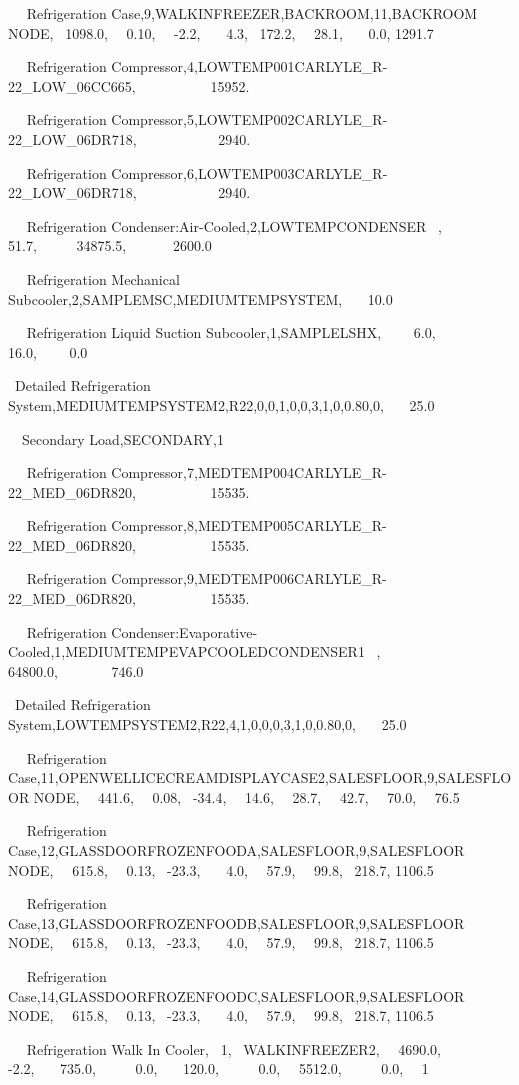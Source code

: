 ~~ Refrigeration Case,9,WALKINFREEZER,BACKROOM,11,BACKROOM NODE,~ 1098.0,~~ 0.10,~~ -2.2,~~~ 4.3,~ 172.2,~~ 28.1,~~~ 0.0, 1291.7

~~ Refrigeration Compressor,4,LOWTEMP001CARLYLE\_R-22\_LOW\_06CC665,~~~~~~~~~~ 15952.

~~ Refrigeration Compressor,5,LOWTEMP002CARLYLE\_R-22\_LOW\_06DR718,~~~~~~~~~~~ 2940.

~~ Refrigeration Compressor,6,LOWTEMP003CARLYLE\_R-22\_LOW\_06DR718,~~~~~~~~~~~ 2940.

~~ Refrigeration Condenser:Air-Cooled,2,LOWTEMPCONDENSER~ ,~~~~~~~~ 51.7,~~~~~ 34875.5,~~~~~~ 2600.0

~~ Refrigeration Mechanical Subcooler,2,SAMPLEMSC,MEDIUMTEMPSYSTEM,~~~ 10.0

~~ Refrigeration Liquid Suction Subcooler,1,SAMPLELSHX,~~~~ 6.0,~~~ 16.0,~~~~ 0.0

~Detailed Refrigeration System,MEDIUMTEMPSYSTEM2,R22,0,0,1,0,0,3,1,0,0.80,0,~~~ 25.0

~~Secondary Load,SECONDARY,1

~~ Refrigeration Compressor,7,MEDTEMP004CARLYLE\_R-22\_MED\_06DR820,~~~~~~~~~~ 15535.

~~ Refrigeration Compressor,8,MEDTEMP005CARLYLE\_R-22\_MED\_06DR820,~~~~~~~~~~ 15535.

~~ Refrigeration Compressor,9,MEDTEMP006CARLYLE\_R-22\_MED\_06DR820,~~~~~~~~~~ 15535.

~~ Refrigeration Condenser:Evaporative-Cooled,1,MEDIUMTEMPEVAPCOOLEDCONDENSER1~ ,~~~~~ 64800.0,~~~~~~~ 746.0

~Detailed Refrigeration System,LOWTEMPSYSTEM2,R22,4,1,0,0,0,3,1,0,0.80,0,~~~ 25.0

~~ Refrigeration Case,11,OPENWELLICECREAMDISPLAYCASE2,SALESFLOOR,9,SALESFLOOR NODE,~~ 441.6,~~ 0.08,~ -34.4,~~ 14.6,~~ 28.7,~~ 42.7,~~ 70.0,~~ 76.5

~~ Refrigeration Case,12,GLASSDOORFROZENFOODA,SALESFLOOR,9,SALESFLOOR NODE,~~ 615.8,~~ 0.13,~ -23.3,~~~ 4.0,~~ 57.9,~~ 99.8,~ 218.7, 1106.5

~~ Refrigeration Case,13,GLASSDOORFROZENFOODB,SALESFLOOR,9,SALESFLOOR NODE,~~ 615.8,~~ 0.13,~ -23.3,~~~ 4.0,~~ 57.9,~~ 99.8,~ 218.7, 1106.5

~~ Refrigeration Case,14,GLASSDOORFROZENFOODC,SALESFLOOR,9,SALESFLOOR NODE,~~ 615.8,~~ 0.13,~ -23.3,~~~ 4.0,~~ 57.9,~~ 99.8,~ 218.7, 1106.5

~~ Refrigeration Walk In Cooler,~ 1,~ WALKINFREEZER2,~~ 4690.0,~~~~ -2.2,~~~ 735.0,~~~~~ 0.0,~~~ 120.0,~~~~~ 0.0,~~ 5512.0,~~~~~ 0.0,~~ 1

